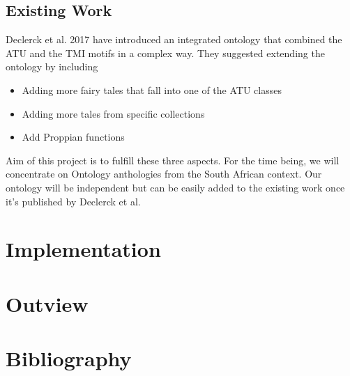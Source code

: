 \documentclass[10pt,a4paper]{article}
\begin{document}
	\subsection{Existing Work} 
	Declerck et al. 2017 have introduced an integrated ontology that combined the ATU and the TMI motifs in a complex way. They suggested extending the ontology by including 
	
	\begin{itemize}
		\item Adding more fairy tales that fall into one of the ATU classes
		\item Adding more tales from specific collections
		\item Add Proppian functions
		
	\end{itemize}	  
	
	Aim of this project is to fulfill these three aspects. For the time being, we will concentrate on Ontology anthologies from the South African context. Our ontology will be independent but can be easily added to the existing work once it's published by Declerck et al. 
\section{Implementation}
\section{Outview}
\section{Bibliography}
\end{document}
